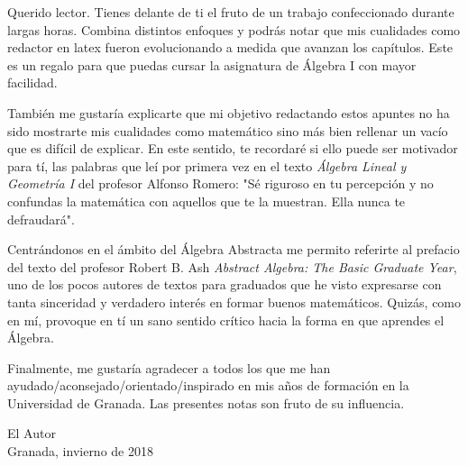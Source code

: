 Querido lector. Tienes delante de ti el fruto de un trabajo confeccionado durante largas horas. Combina distintos enfoques y podrás notar que mis cualidades como redactor en latex fueron evolucionando a medida que avanzan los capítulos. Este es un regalo para que puedas cursar la asignatura de Álgebra I con mayor facilidad. 

También me gustaría explicarte que mi objetivo redactando estos apuntes no ha sido mostrarte mis cualidades como matemático sino más bien rellenar un vacío que es difícil de explicar. En este sentido, te recordaré si ello puede ser motivador para tí, las palabras que leí por primera vez en el texto \textit{Álgebra Lineal y Geometría I} del profesor Alfonso Romero: "Sé riguroso en tu percepción y no confundas la matemática con aquellos que te la muestran. Ella nunca te defraudará". 

Centrándonos en el ámbito del Álgebra Abstracta me permito referirte al prefacio del texto del profesor Robert B. Ash \textit{Abstract Algebra: The Basic Graduate Year}, uno de los pocos autores de textos para graduados que he visto expresarse con tanta sinceridad y verdadero interés en formar buenos matemáticos. Quizás, como en mí, provoque en tí un sano sentido crítico hacia la forma en que aprendes el Álgebra.

Finalmente, me gustaría agradecer a todos los que me han ayudado/aconsejado/orientado/inspirado en mis años de formación en la Universidad de Granada. Las presentes notas son fruto de su influencia.  

\medskip
\begin{flushleft}
  El Autor\\
  Granada, invierno de 2018\\
\end{flushleft}


